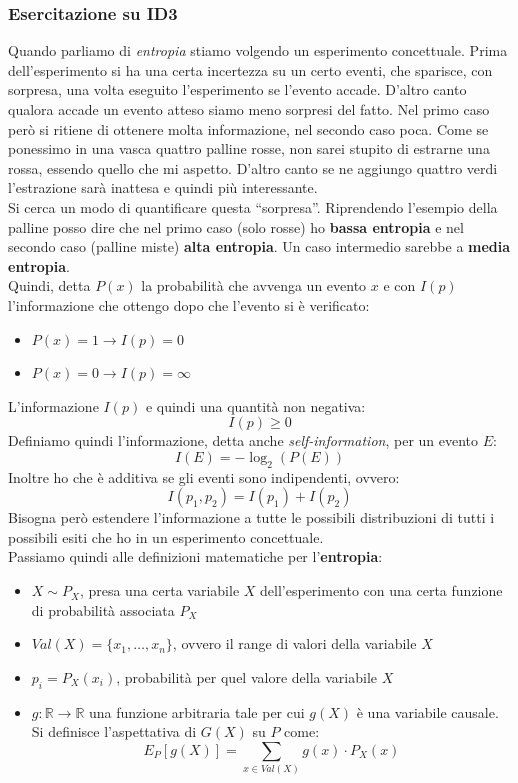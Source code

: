 \documentclass[a4paper,12pt, oneside]{book}
\begin{document}
\subsubsection{Esercitazione su ID3}
Quando parliamo di \textit{entropia} stiamo volgendo un esperimento
concettuale. Prima dell'esperimento si ha una certa incertezza su un certo
eventi, che sparisce, con sorpresa, una volta eseguito l'esperimento se l'evento
accade. D'altro canto qualora accade un evento atteso siamo meno sorpresi del
fatto. Nel primo caso però si ritiene di ottenere molta informazione, nel
secondo caso poca. Come se ponessimo in una vasca quattro palline rosse, non
sarei stupito di estrarne una rossa, essendo quello che mi aspetto. D'altro
canto se ne aggiungo quattro verdi l'estrazione sarà inattesa e quindi più
interessante.\\ 
Si cerca un modo di quantificare questa ``sorpresa''. Riprendendo l'esempio
della palline posso dire che nel primo caso (solo rosse) ho \textbf{bassa
  entropia} e nel secondo caso (palline miste) \textbf{alta entropia}. Un caso
intermedio sarebbe a \textbf{media entropia}.\\
Quindi, detta $P(x)$ la probabilità che avvenga un evento $x$ e con $I(p)$
l'informazione che ottengo dopo che l'evento si è verificato:
\begin{itemize}
  \item $P(x)=1\to I(p)=0$
  \item $P(x)=0\to I(p)=\infty$
\end{itemize}
L'informazione $I(p)$ e quindi una quantità non negativa:
\[I(p)\geq 0\]
Definiamo quindi l'informazione, detta anche \textit{self-information}, per un
evento $E$: 
\[I(E)=-\log_2(P(E))\]
Inoltre ho che è additiva se gli eventi sono indipendenti, ovvero:
\[I(p_1,p_2)=I(p_1)+I(p_2)\]
Bisogna però estendere l'informazione a tutte le possibili distribuzioni di
tutti i possibili esiti che ho in un esperimento concettuale.\\
Passiamo quindi alle definizioni matematiche per l'\textbf{entropia}:
\begin{itemize}
  \item $X\sim P_X$, presa una certa variabile $X$ dell'esperimento con una
  certa funzione di probabilità associata $P_X$
  \item $Val(X)=\{x_1,\ldots,x_n\}$, ovvero il range di valori della variabile
  $X$
  \item $p_i=P_X(x_i)$, probabilità per quel valore della variabile $X$
  \item $g:\mathbb{R}\to\mathbb{R}$ una funzione arbitraria tale per cui $g(X)$
  è una variabile causale. Si definisce l'aspettativa di $G(X)$ su $P$ come:
  \[E_P[g(X)]=\sum_{x\in Val(X)} g(x)\cdot P_X(x)\]
\end{itemize}
\end{document}
